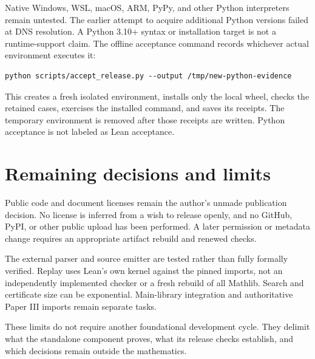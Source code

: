 \documentclass[11pt,letterpaper,oneside,openany]{book}
\theoremstyle{quiet}
\begin{document}
Native Windows, WSL, macOS, ARM, PyPy, and other Python interpreters remain untested. The earlier attempt to acquire additional Python versions failed at DNS resolution. A Python 3.10+ syntax or installation target is not a runtime-support claim. The offline acceptance command records whichever actual environment executes it:

\begin{Verbatim}[fontsize=\small,breaklines=true]
python scripts/accept_release.py --output /tmp/new-python-evidence
\end{Verbatim}

This creates a fresh isolated environment, installs only the local wheel, checks the retained cases, exercises the installed command, and saves its receipts. The temporary environment is removed after those receipts are written. Python acceptance is not labeled as Lean acceptance.

\section{Remaining decisions and limits}

Public code and document licenses remain the author's unmade publication decision. No license is inferred from a wish to release openly, and no GitHub, PyPI, or other public upload has been performed. A later permission or metadata change requires an appropriate artifact rebuild and renewed checks.

The external parser and source emitter are tested rather than fully formally verified. Replay uses Lean's own kernel against the pinned imports, not an independently implemented checker or a fresh rebuild of all Mathlib. Search and certificate size can be exponential. Main-library integration and authoritative Paper III imports remain separate tasks.

These limits do not require another foundational development cycle. They delimit what the standalone component proves, what its release checks establish, and which decisions remain outside the mathematics.
\end{document}
